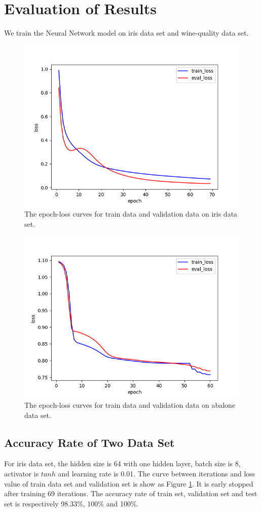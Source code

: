 \section{Evaluation of Results}\label{sec:evaluation}
We train the Neural Network model on iris data set and wine-quality data set. 

\begin{figure}[tbp]
	\centering
	\includegraphics[width = .5\textwidth]{images/iris_loss.png}
	\caption{The epoch-loss curves for train data and validation data on iris data set.}
	\label{fig:iris_loss}
\end{figure}

\begin{figure}[tbp]
	\centering
	\includegraphics[width = .5\textwidth]{images/ablone-loss.png}
	\caption{The epoch-loss curves for train data and validation data on abalone data set.}
	\label{fig:wine_loss}
\end{figure}

\subsection{Accuracy Rate of Two Data Set}
For iris data set, the hidden size is 64 with one hidden layer, batch size is 8, activator is \(tanh\) and learning rate is 0.01. The curve between iterations and loss value of train data set and validation set is show as Figure \ref{fig:iris_loss}. It is early stopped after training 69 iterations. The accuracy rate of train set, validation set and test set is respectively 98.33\%, 100\% and 100\%.

